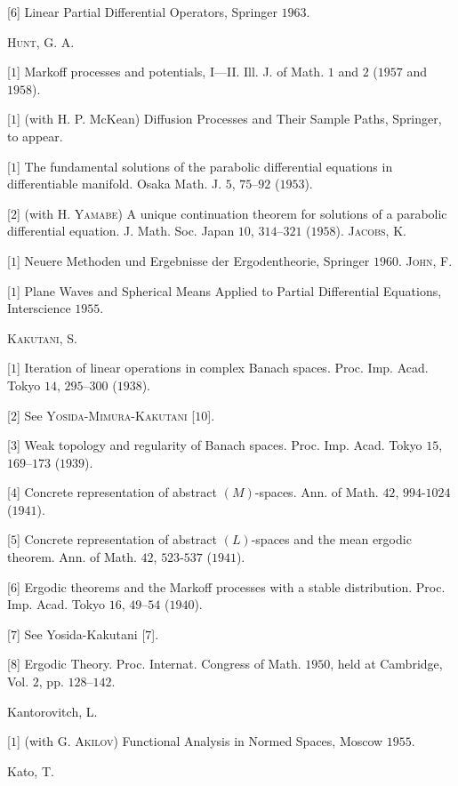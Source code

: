 [$6$] Linear Partial Differential Operators, Springer $1963$. 

\textsc{Hunt}, G. A. 

[$1$] Markoff processes and potentials, I---II. Ill. J. of Math. $1$ and $2$ ($1957$ and $1958$). 

[$1$] (with H. P. McKean) Diffusion Processes and Their Sample Paths, Springer, to appear. 


[$1$] The fundamental solutions of the parabolic differential equations in differentiable manifold. Osaka Math. J. $5$, $75$--$92$ ($1953$). 

[$2$] (with H. \textsc{Yamabe}) A unique continuation theorem for solutions of a parabolic differential equation. J. Math. Soc. Japan $10$, $314$--$321$ ($1958$). \textsc{Jacobs}, K. 

[$1$] Neuere Methoden und Ergebnisse der Ergodentheorie, Springer $1960$. \textsc{John}, F. 

[$1$] Plane Waves and Spherical Means Applied to Partial Differential Equations, Interscience $1955$. 

\textsc{Kakutani}, S. 

[$1$] Iteration of linear operations in complex Banach spaces. Proc. Imp. Acad. Tokyo $14$, $295$--$300$ ($1938$). 

[$2$] See \textsc{Yosida}-\textsc{Mimura}-\textsc{Kakutani} [$10$]. 

[$3$] Weak topology and regularity of Banach spaces. Proc. Imp. Acad. Tokyo $15$, $169$--$173$ ($1939$). 

[$4$] Concrete representation of abstract $(M)$-spaces. Ann. of Math. $42$, $994$-$1024$ ($1941$). 

[$5$] Concrete representation of abstract $(L)$-spaces and the mean ergodic theorem. Ann. of Math. $42$, $523$-$537$ ($1941$). 

[$6$] Ergodic theorems and the Markoff processes with a stable distribution. Proc. Imp. Acad. Tokyo $16$, $49$--$54$ ($1940$). 

[$7$] See Yosida-Kakutani [$7$]. 

[$8$] Ergodic Theory. Proc. Internat. Congress of Math. $1950$, held at Cambridge, Vol. $2$, pp. $128$--$142$. 

Kantorovitch, L. 

[$1$] (with G. \textsc{Akilov}) Functional Analysis in Normed Spaces, Moscow $1955$. 

Kato, T. 

